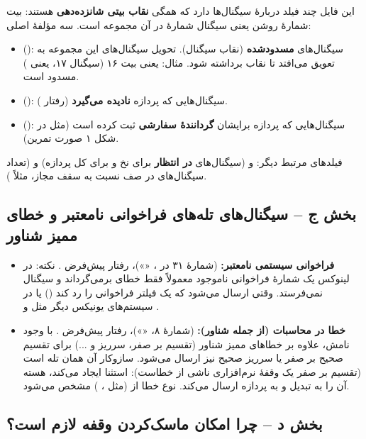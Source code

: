این فایل چند فیلد دربارهٔ سیگنال‌ها دارد که همگی \textbf{نقاب بیتی شانزده‌دهی} هستند: بیت شمارهٔ  روشن یعنی سیگنال شمارهٔ  در آن مجموعه است. سه مؤلفهٔ اصلی:
\begin{itemize}
  \item {} (): سیگنال‌های \textbf{مسدودشده} (نقاب سیگنال). تحویل سیگنال‌های این مجموعه به تعویق می‌افتد تا نقاب برداشته شود. مثال:  یعنی بیت ۱۶ (سیگنال ۱۷، یعنی ) مسدود است.
  \item {} (): سیگنال‌هایی که پردازه \textbf{نادیده می‌گیرد} (رفتار ).
  \item {} (): سیگنال‌هایی که پردازه برایشان \textbf{گردانندهٔ سفارشی} ثبت کرده است (مثل  در شکل ۱ صورت تمرین).
\end{itemize}

فیلدهای مرتبط دیگر:  و  (سیگنال‌های \textbf{در انتظار} برای نخ و برای کل پردازه) و  (تعداد سیگنال‌های در صف نسبت به سقف مجاز، مثلاً ).

\subsection*{بخش ج – سیگنال‌های تله‌های فراخوانی نامعتبر و خطای ممیز شناور}

\begin{itemize}
  \item \textbf{فراخوانی سیستمی نامعتبر:}  (شمارهٔ ۳۱ در ، «»)، رفتار پیش‌فرض . نکته: در لینوکس یک شمارهٔ فراخوانی ناموجود معمولاً فقط خطای  برمی‌گرداند و سیگنال نمی‌فرستد.  وقتی ارسال می‌شود که یک فیلتر  فراخوانی را رد کند () یا در سیستم‌های یونیکس دیگر مثل  و .
  \item \textbf{خطا در محاسبات (از جمله شناور):}  (شمارهٔ ۸، «»)، رفتار پیش‌فرض . با وجود نامش، علاوه بر خطاهای ممیز شناور (تقسیم بر صفر، سرریز و ...) برای تقسیم صحیح بر صفر یا سرریز صحیح نیز ارسال می‌شود. سازوکار آن همان تله است (تقسیم بر صفر یک وقفهٔ نرم‌افزاری ناشی از خطاست):  استثنا ایجاد می‌کند، هسته آن را به  تبدیل و به پردازه ارسال می‌کند. نوع خطا از  (مثل ، ) مشخص می‌شود.
\end{itemize}

\subsection*{بخش د – چرا امکان ماسک‌کردن وقفه لازم است؟}

